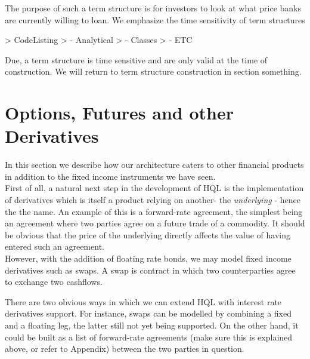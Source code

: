 The purpose of such a term structure is for investors to look at what price 
banks are currently willing to loan. We emphasize the time sensitivity of term 
structures

> CodeListing
> 	- Analytical
>	- Classes
>	- ETC

Due, a term structure is time sensitive and are only valid at the time of 
construction. We will return to term structure construction in section 
something.

\section{Options, Futures and other Derivatives}

In this section we describe how our architecture caters to other financial 
products in addition to the fixed income instruments we have seen.\\

First of all, a natural next step in the development of HQL is the 
implementation of derivatives which is itself a product relying on another- the 
\emph{underlying} - hence the the name. An example of this is 
a forward-rate agreement, the simplest being an agreement where two parties 
agree on a future trade of a commodity. It should be obvious that the price of 
the underlying directly affects the value of having entered such an agreement.\\

However, with the addition of floating rate bonds, we may model fixed income 
derivatives such as swaps. A swap is contract in which two counterparties agree 
to exchange two cashflows.


There are two obvious ways in which we can extend HQL with interest rate 
derivatives support. For instance, swaps can be modelled by combining a fixed 
and a floating leg, the latter still not yet being supported. On the other 
hand, it could be built as a list of forward-rate agreements (make sure this is 
explained above, or refer to Appendix) between the two parties in question.
